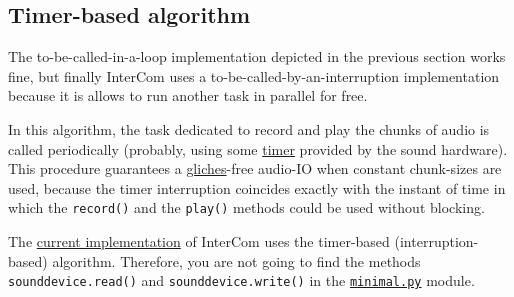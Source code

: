 \subsection{Timer-based algorithm}

The to-be-called-in-a-loop implementation depicted in the previous
section works fine, but finally InterCom uses a
to-be-called-by-an-interruption implementation because it is allows to
run another task in parallel for free.

In this algorithm, the task dedicated to record and play the chunks of
audio is called periodically (probably, using some
\href{https://en.wikipedia.org/wiki/Timer}{timer} provided by the
sound hardware). This procedure guarantees a
\href{https://en.wikipedia.org/wiki/Glitch}{gliches}-free audio-IO
when constant chunk-sizes are used, because the timer interruption
coincides exactly with the instant of time in which the
\verb|record()| and the \verb|play()| methods could be used without
blocking.

The
\href{https://github.com/Tecnologias-multimedia/InterCom/blob/master/src/minimal.py#L124}{current
  implementation} of InterCom uses the timer-based
(interruption-based) algorithm. Therefore, you are not going to find
the methods \texttt{sounddevice.read()} and
\texttt{sounddevice.write()} in the
\href{https://github.com/Tecnologias-multimedia/InterCom/blob/master/src/minimal.py}{\texttt{minimal.py}}
module.

